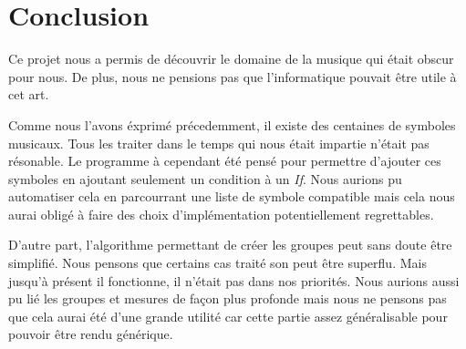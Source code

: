 \section{Conclusion}

Ce projet nous a permis de découvrir le domaine de la musique qui était obscur pour nous. De plus, nous ne pensions pas que l'informatique pouvait être utile à cet art.

\par
Comme nous l'avons éxprimé précedemment, il existe des centaines de symboles musicaux. Tous les traiter dans le temps qui nous était impartie n'était pas résonable. Le programme à cependant été pensé pour permettre d'ajouter ces symboles en ajoutant seulement un condition à un \emph{If}. Nous aurions pu automatiser cela en parcourrant une liste de symbole compatible mais cela nous aurai obligé à faire des choix d'implémentation potentiellement regrettables.

\par
D'autre part, l'algorithme permettant de créer les groupes peut sans doute être simplifié. Nous pensons que certains cas traité son peut être superflu. Mais jusqu'à présent il fonctionne, il n'était pas dans nos priorités. Nous aurions aussi pu lié les groupes et mesures de façon plus profonde mais nous ne pensons pas que cela aurai été d'une grande utilité car cette partie assez généralisable pour pouvoir être rendu générique.
